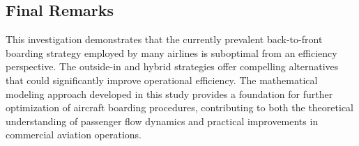 \subsection{Final Remarks}

This investigation demonstrates that the currently prevalent back-to-front boarding strategy employed by many airlines is suboptimal from an efficiency perspective. The outside-in and hybrid strategies offer compelling alternatives that could significantly improve operational efficiency. The mathematical modeling approach developed in this study provides a foundation for further optimization of aircraft boarding procedures, contributing to both the theoretical understanding of passenger flow dynamics and practical improvements in commercial aviation operations.